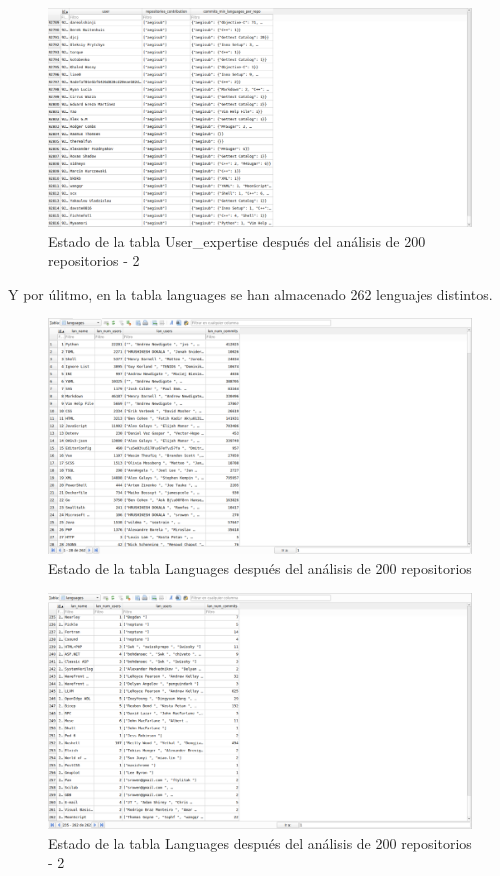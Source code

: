 \documentclass[a4paper, 12pt]{book}
\begin{document}
\begin{figure}[H]
  \centering
  \includegraphics[width=1\textwidth]{img/tablauserexp2.png}
  \caption{Estado de la tabla User\_expertise después del análisis de 200 repositorios - 2}
  \label{figura:userexpafter2}
\end{figure}

Y por úlitmo, en la tabla languages se han almacenado 262 lenguajes distintos.

\begin{figure}[H]
  \centering
  \includegraphics[width=1\textwidth]{img/tablalan1.png}
  \caption{Estado de la tabla Languages después del análisis de 200 repositorios}
  \label{figura:lanafter1}
\end{figure}

\begin{figure}[H]
  \centering
  \includegraphics[width=1\textwidth]{img/tablalan2.png}
  \caption{Estado de la tabla Languages después del análisis de 200 repositorios - 2}
  \label{figura:lanafter2}
\end{figure}
\end{document}
